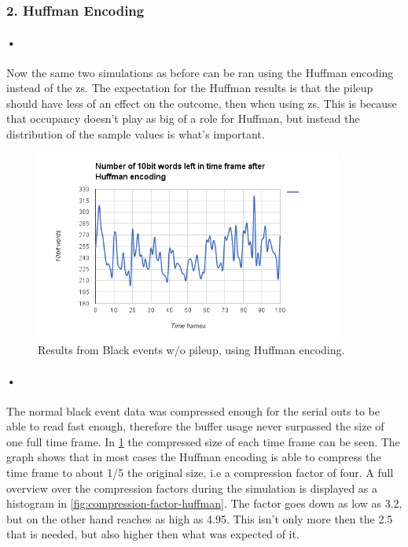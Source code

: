 \documentclass[a4paper, 12pt]{report}\dfrac{\right }{•}
\begin{document}
\subsubsection{2. Huffman Encoding}

\paragraph{•}
Now the same two simulations as before can be ran using the Huffman encoding instead of the \gls{zs}.
The expectation for the Huffman results is that the pileup should have less of an effect on the outcome, then when using \gls{zs}.
This is because that occupancy doesn't play as big of a role for Huffman, but instead the distribution of the sample values is what's important.

\begin{figure}[h!]
	\centering
		\includegraphics[width=0.9\textwidth]{images/blackevents-huffman.png}
		\caption{Results from Black events w/o pileup, using Huffman encoding.}
		\label{fig:blackevents-huffman}
\end{figure}

\paragraph{•}
The normal black event data was compressed enough for the serial outs to be able to read fast enough, therefore the buffer usage never surpassed the size of one full time frame.
In \ref{fig:blackevents-huffman} the compressed size of each time frame can be seen.
The graph shows that in most cases the Huffman encoding is able to compress the time frame to about 1/5 the original size, i.e a compression factor of four.
A full overview over the compression factors during the simulation is displayed as a histogram in \ref{fig:compression-factor-huffman}.
The factor goes down as low as 3.2, but on the other hand reaches as high as 4.95.
This isn't only more then the 2.5 that is needed, but also higher then what was expected of it.
\end{document}
